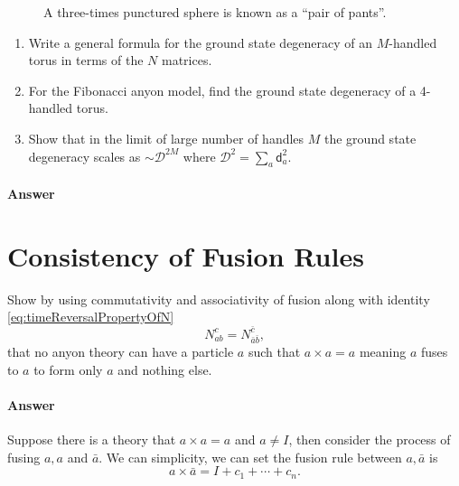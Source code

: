 \documentclass{book}
\begin{document}
\begin{figure}[h!]
\caption{A three-times punctured sphere is known as a ``pair of pants”.}
\label{fig:pairOfPants}
\end{figure}


\begin{enumerate}
\item Write a general formula for the ground state degeneracy of an $M$-handled torus in terms of the $N$ matrices.
\item For the Fibonacci anyon model, find the ground state degeneracy of a 4-handled torus.
\item Show that in the limit of large number of handles $M$ the ground state degeneracy scales as $\sim \mathcal{D}^{2M}$ where $\mathcal{D}^{2} =\sum _{a}\mathrm{\mathsf{d}}_{a}^{2}$.
\end{enumerate}

\paragraph{Answer}



\section{Consistency of Fusion Rules}
Show by using commutativity and associativity of fusion along with identity \eqref{eq:timeReversalPropertyOfN}
\begin{equation}
N_{ab}^{c} =N_{\bar{a}\bar{b}}^{\bar{c}} ,
\label{eq:timeReversalPropertyOfN}
\end{equation}
that no anyon theory can have a particle $a$ such that $a\times a=a$ meaning $a$ fuses to $a$ to form only $a$ and nothing else.

\paragraph{Answer}
Suppose there is a theory that $a\times a=a$ and $a\neq I$, then consider the process of fusing $a,a$ and $\bar{a}$. We can simplicity, we can set the fusion rule between $a,\bar{a}$ is
\begin{equation}
a\times \bar{a} =I+c_{1} +\cdots +c_{n} .
\label{eq:fusionChannelOfaabar}
\end{equation}
\end{document}
